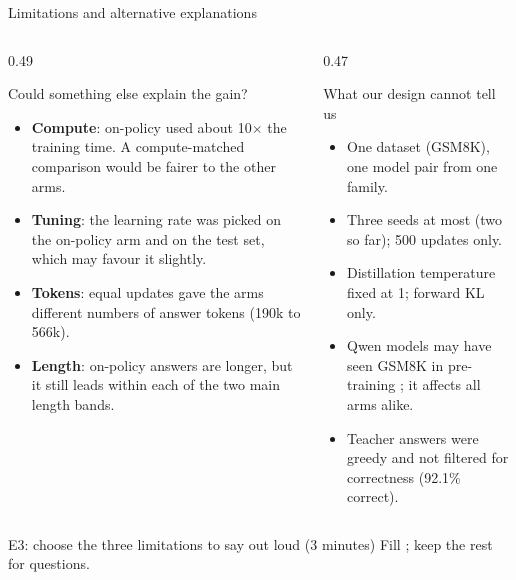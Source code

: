 \begin{frame}{Limitations and alternative explanations\hfill{}}
  \begin{columns}[T]
    \begin{column}{0.49\textwidth}
      \begin{block}{Could something else explain the gain?}
        \footnotesize
        \begin{itemize}
          \item \textbf{Compute}: on-policy used about 10$\times$ the training
                time. A compute-matched comparison would be fairer to the
                other arms.
          \item \textbf{Tuning}: the learning rate was picked on the on-policy
                arm and on the test set, which may favour it slightly.
          \item \textbf{Tokens}: equal updates gave the arms different
                numbers of answer tokens (190k to 566k).
          \item \textbf{Length}: on-policy answers are longer, but it still
                leads within each of the two main length bands.
        \end{itemize}
      \end{block}
    \end{column}
    \begin{column}{0.47\textwidth}
      \begin{block}{What our design cannot tell us}
        \footnotesize
        \begin{itemize}
          \item One dataset (GSM8K), one model pair from one family.
          \item Three seeds at most (two so far); 500 updates only.
          \item Distillation temperature fixed at 1; forward KL only.
          \item Qwen models may have seen GSM8K in pre-training
                ; it affects all arms alike.
          \item Teacher answers were greedy and not filtered for
                correctness (92.1\% correct).
        \end{itemize}
      \end{block}
    \end{column}
  \end{columns}
  \vspace{0.1cm}
  \begin{todobox}{E3: choose the three limitations to say out loud (3 minutes)}
    Fill ; keep the rest for questions.
  \end{todobox}
\end{frame}
